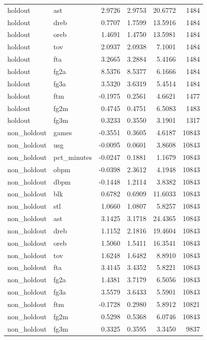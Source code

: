 \begin{table}
\begin{tabular}{llrrrr}
holdout & ast & 2.9726 & 2.9753 & 20.6772 & 1484 \\
holdout & dreb & 0.7707 & 1.7599 & 13.5916 & 1484 \\
holdout & oreb & 1.4691 & 1.4750 & 13.5981 & 1484 \\
holdout & tov & 2.0937 & 2.0938 & 7.1001 & 1484 \\
holdout & fta & 3.2665 & 3.2884 & 5.4166 & 1484 \\
holdout & fg2a & 8.5376 & 8.5377 & 6.1666 & 1484 \\
holdout & fg3a & 3.5320 & 3.6319 & 5.4514 & 1484 \\
holdout & ftm & -0.1975 & 0.2561 & 4.6621 & 1477 \\
holdout & fg2m & 0.4745 & 0.4751 & 6.5083 & 1483 \\
holdout & fg3m & 0.3233 & 0.3550 & 3.1901 & 1317 \\
non\_holdout & games & -0.3551 & 0.3605 & 4.6187 & 10843 \\
non\_holdout & usg & -0.0095 & 0.0601 & 3.8608 & 10843 \\
non\_holdout & pct\_minutes & -0.0247 & 0.1881 & 1.1679 & 10843 \\
non\_holdout & obpm & -0.0398 & 2.3612 & 4.1948 & 10843 \\
non\_holdout & dbpm & -0.1448 & 1.2114 & 3.8382 & 10843 \\
non\_holdout & blk & 0.6782 & 0.6909 & 11.6033 & 10843 \\
non\_holdout & stl & 1.0660 & 1.0807 & 5.8257 & 10843 \\
non\_holdout & ast & 3.1425 & 3.1718 & 24.4365 & 10843 \\
non\_holdout & dreb & 1.1152 & 2.1816 & 19.4604 & 10843 \\
non\_holdout & oreb & 1.5060 & 1.5411 & 16.3541 & 10843 \\
non\_holdout & tov & 1.6248 & 1.6482 & 8.8910 & 10843 \\
non\_holdout & fta & 3.4145 & 3.4352 & 5.8221 & 10843 \\
non\_holdout & fg2a & 1.4381 & 3.7179 & 6.5056 & 10843 \\
non\_holdout & fg3a & 3.5579 & 3.6433 & 5.5901 & 10843 \\
non\_holdout & ftm & -0.1728 & 0.2980 & 5.8912 & 10821 \\
non\_holdout & fg2m & 0.5298 & 0.5368 & 6.0746 & 10843 \\
non\_holdout & fg3m & 0.3325 & 0.3595 & 3.3450 & 9837 \\
\bottomrule
\end{tabular}
\end{table}
